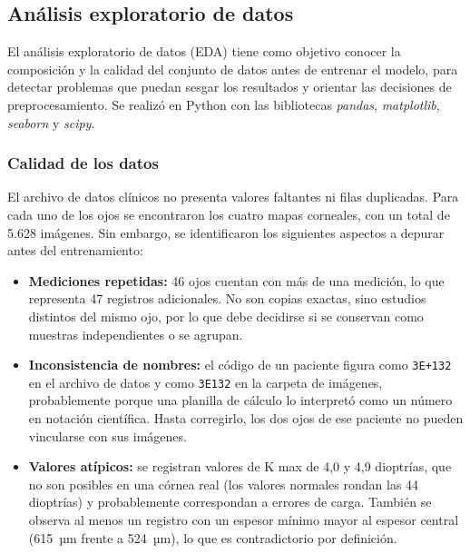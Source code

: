     \subsection{Análisis exploratorio de datos}

        El análisis exploratorio de datos (EDA) tiene como objetivo conocer la composición y la calidad del conjunto de datos antes de entrenar el modelo, para detectar problemas que puedan sesgar los resultados y orientar las decisiones de preprocesamiento. Se realizó en Python con las bibliotecas \textit{pandas}, \textit{matplotlib}, \textit{seaborn} y \textit{scipy}.

        \subsubsection*{Calidad de los datos}

            El archivo de datos clínicos no presenta valores faltantes ni filas duplicadas. Para cada uno de los ojos se encontraron los cuatro mapas corneales, con un total de 5.628 imágenes. Sin embargo, se identificaron los siguientes aspectos a depurar antes del entrenamiento:

            \begin{itemize}[leftmargin=*]
                \item \textbf{Mediciones repetidas:} 46 ojos cuentan con más de una medición, lo que representa 47 registros adicionales. No son copias exactas, sino estudios distintos del mismo ojo, por lo que debe decidirse si se conservan como muestras independientes o se agrupan.

                \item \textbf{Inconsistencia de nombres:} el código de un paciente figura como \texttt{3E+132} en el archivo de datos y como \texttt{3E132} en la carpeta de imágenes, probablemente porque una planilla de cálculo lo interpretó como un número en notación científica. Hasta corregirlo, los dos ojos de ese paciente no pueden vincularse con sus imágenes.

                \item \textbf{Valores atípicos:} se registran valores de K max de 4,0 y 4,9 dioptrías, que no son posibles en una córnea real (los valores normales rondan las 44 dioptrías) y probablemente correspondan a errores de carga. También se observa al menos un registro con un espesor mínimo mayor al espesor central (615~µm frente a 524~µm), lo que es contradictorio por definición.
            \end{itemize}

